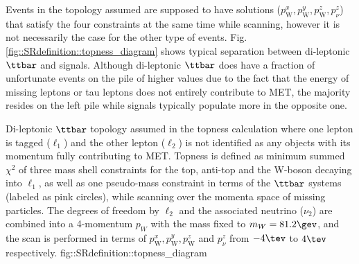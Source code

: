 Events in the topology assumed are supposed to have solutions ($p_{\mathrm{W}}^x, p_{\mathrm{W}}^y, p_{\mathrm{W}}^z, p_{\nu}^z$) that satisfy the four constraints at the same time while scanning, however it is not necessarily the case for the other type of events. Fig. \ref{fig::SRdefinition::topness_diagram} shows typical separation between di-leptonic $\ttbar$ and signals. Although di-leptonic $\ttbar$ does have a fraction of unfortunate events on the pile of higher values due to the fact that the energy of missing leptons or tau leptons does not entirely contribute to MET, the majority resides on the left pile while signals typically populate  more in the opposite one. 

{Di-leptonic $\ttbar$ topology assumed in the topness calculation where one lepton is tagged ($\ell_1$) and the other lepton ($\ell_2$) is not identified as any objects with its momentum fully contributing to MET. Topness is defined as minimum summed $\chi^2$ of three mass shell constraints for the top, anti-top and the W-boson decaying into $\ell_1$, as well as one pseudo-mass constraint in terms of the $\ttbar$ systems (labeled as pink circles), while scanning over the momenta space of missing particles. The degrees of freedom by $\ell_2$ and the associated neutrino ($\nu_2$) are combined into a 4-momentum $p_W$ with the mass fixed to $m_W = 81.2\gev$, and the scan is performed in terms of $p_{\mathrm{W}}^x, p_{\mathrm{W}}^y, p_{\mathrm{W}}^z$ and $p_{\nu}^z$ from $-4\tev$ to $4\tev$ respectively.}
{fig::SRdefinition::topness_diagram}

